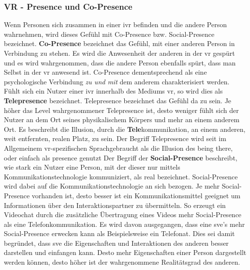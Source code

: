 \documentclass[a4paper,11pt]{article}%
\renewcommand{\\}{\vspace*{0.5\baselineskip} \newline}
\begin{document}
		\subsubsection{VR - Presence und Co-Presence}
Wenn Personen sich zusammen in einer \ac{ivr} befinden und die andere Person wahrnehmen, wird dieses Gefühl mit  \dq Co-Presence bzw. Social-Presence\dq{} bezeichnet. \citep{schuemie2001research}\\
\textbf{\dq Co-Presence\dq{}} bezeichnet das Gefühl, mit einer anderen Person in Verbindung zu stehen.
Es wird die Anwesenheit der anderen in der \ac{vr} gespürt und es wird wahrgenommen, dass die andere Person ebenfalls spürt, dass man Selbst in der \ac{vr} anwesend ist. 
Co-Presence dementsprechend als eine psychologische Verbindung \textit{zu und mit} dem anderem charakterisiert werden.  \\
Fühlt sich ein Nutzer einer \ac{ivr} \dq{}innerhalb\dq{} des Mediums \ac{vr}, so wird dies als \textbf{Telepresence} bezeichnet. Telepresence bezeichnet das Gefühl \dq{}da zu sein\dq{}. Je höher das Level wahrgenommener Telepresence ist, desto weniger fühlt sich der Nutzer an dem Ort seines physikalischem Körpers und mehr an einem anderem Ort. \citep[p.482]{nowak2004effect} Es beschreibt die Illusion, durch die \textbf{Tele}kommunikation, an einem anderen, weit entfernten, realen Platz, zu sein. Der Begriff Telepresence wird seit \cite[p.12]{biocca1999cyborg} im Allgemeinem \ac{vr}-spezifischen Sprachgebraucht als die Illusion des \dq{}being there\dq{}, oder einfach als \dq{}presence\dq{} genutzt\\
Der Begriff der \dq{}\textbf{Social-Presence} \dq{} beschreibt, wie stark ein Nutzer eine Person, mit der dieser nur mittels Kommunikationstechnologie kommuniziert, als \dq{}real\dq{} bezeichnet. Social-Presence wird dabei auf die Kommunikationstechnologie an sich bezogen. Je mehr Social-Presence vorhanden ist, desto besser ist ein Kommunikationsmittel geeignet um Informationen über den Interaktionspartner zu übermitteln. So erzeugt ein Videochat durch die zusätzliche Übertragung eines Videos mehr Social-Presence als eine Telefonkommunikation.  \citep[p.151]{gunawardena1995social}
Es wird davon ausgegangen, dass eine \ac{sve}'s mehr Social-Presence erwecken kann als Beispielsweise ein Telefonat. Dies sei damit begründet, dass \ac{sve} die Eigenschaften und Interaktionen des anderen besser darstellen und einfangen kann. Desto mehr Eigenschaften einer Person dargestellt werden können, desto höher ist der wahrgenommene Realitätsgrad des anderen. \citep[p. 5-8]{biocca2002defining}\\
\end{document}
